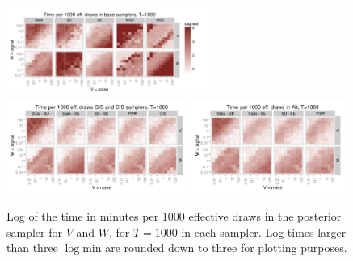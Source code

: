 \documentclass{article}
\begin{document}
\begin{figure}[!h]
\centering
\includegraphics[width=0.59\textwidth]{basecistimeplot1000}
\includegraphics[width=0.53\textwidth]{altgisVtimeplot1000}
\includegraphics[width=0.45\textwidth]{altgisWtimeplot1000}
\caption{Log of the time in minutes per 1000 effective draws in the posterior sampler for $V$ and $W$, for $T=1000$ in each sampler. Log times larger than three $\log \mathrm{min}$ are rounded down to three for plotting purposes.}
\label{baseinttimeplot3}
\end{figure}




\clearpage

\end{document}
